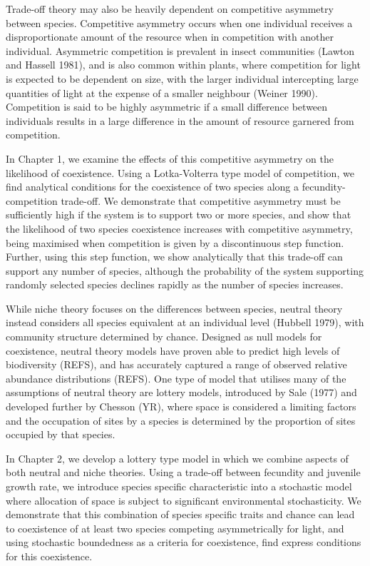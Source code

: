  Trade-off theory may also be heavily dependent on competitive asymmetry between species. Competitive asymmetry occurs when one individual receives a disproportionate amount of the resource when in competition with another individual. Asymmetric competition is prevalent in insect communities (Lawton and Hassell 1981), and is also common within plants, where competition for light is expected to be dependent on size, with the larger individual intercepting large quantities of light at the expense of a smaller neighbour (Weiner 1990). Competition is said to be highly asymmetric if a small difference between individuals results in a large difference in the amount of resource garnered from competition.
 
 In Chapter 1, we examine the effects of this competitive asymmetry on the likelihood of coexistence. Using a Lotka-Volterra type model of competition, we find analytical conditions for the coexistence of two species along a fecundity-competition trade-off. We demonstrate that competitive asymmetry must be sufficiently high if the system is to support two or more species, and show that the likelihood of two species coexistence increases with competitive asymmetry, being maximised when competition is given by a discontinuous step function. Further, using this step function, we show analytically that this trade-off can support any number of species, although the probability of the system supporting randomly selected species declines rapidly as the number of species increases.
 
 While niche theory focuses on the differences between species, neutral theory instead considers all species equivalent at an individual level (Hubbell 1979), with community structure determined by chance. Designed as null models for coexistence, neutral theory models have proven able to predict high levels of biodiversity (REFS), and has accurately captured a range of observed relative abundance distributions (REFS). One type of model that utilises many of the assumptions of neutral theory are lottery models, introduced by Sale (1977) and developed further by Chesson (YR), where space is considered a limiting factors and the occupation of sites by a species is determined by the proportion of sites occupied by that species.

In Chapter 2, we develop a lottery type model in which we combine aspects of both neutral and niche theories. Using a trade-off between fecundity and juvenile growth rate, we introduce species specific characteristic into a stochastic model where  allocation of space is subject to significant environmental stochasticity. We demonstrate that this combination of species specific traits and chance can lead to coexistence of at least two species competing asymmetrically for light, and using stochastic boundedness as a criteria for coexistence, find express conditions for this coexistence. 

